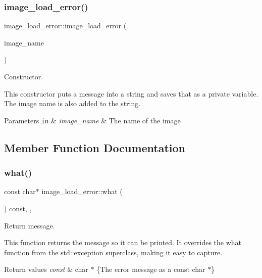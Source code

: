 \subsubsection{\texorpdfstring{image\+\_\+load\+\_\+error()}{image\_load\_error()}}
{\footnotesize\ttfamily image\+\_\+load\+\_\+error\+::image\+\_\+load\+\_\+error (\begin{DoxyParamCaption}\item[{const std\+::string \&}]{image\+\_\+name }\end{DoxyParamCaption})\hspace{0.3cm}{\ttfamily [inline]}}



Constructor. 

This constructor puts a message into a string and saves that as a private variable. The image name is also added to the string.


\begin{DoxyParams}[1]{Parameters}
\mbox{\tt in}  & {\em image\+\_\+name} & The name of the image \\
\hline
\end{DoxyParams}


\subsection{Member Function Documentation}
\mbox{\label{classimage__load__error_ab73fa8f110ff313005a7bb0ed66fd880}} 
\subsubsection{\texorpdfstring{what()}{what()}}
{\footnotesize\ttfamily const char$\ast$ image\+\_\+load\+\_\+error\+::what (\begin{DoxyParamCaption}{ }\end{DoxyParamCaption}) const\hspace{0.3cm}{\ttfamily [inline]}, {\ttfamily [override]}, {\ttfamily [noexcept]}}



Return message. 

This function returns the message so it can be printed. It overrides the what function from the std\+::exception superclass, making it easy to capture.


\begin{DoxyRetVals}{Return values}
{\em const} & char $\ast$ \{The error message as a const char $\ast$\} \\
\hline
\end{DoxyRetVals}


